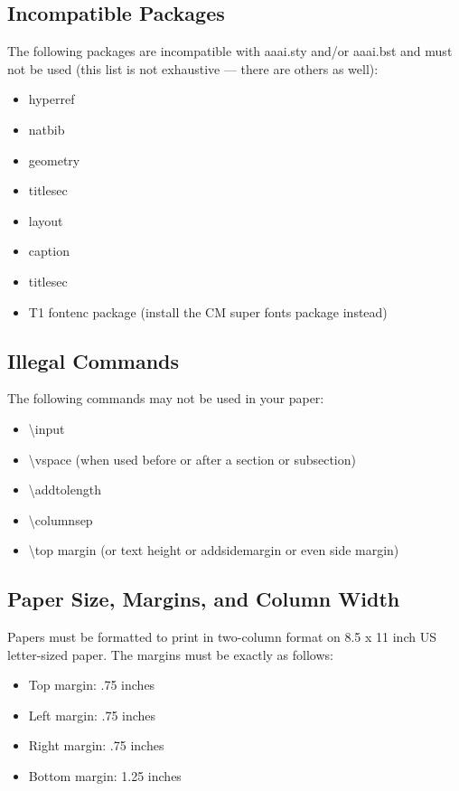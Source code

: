 \documentclass[letterpaper]{article}
\begin{document}
\subsection{Incompatible Packages}
The following packages are incompatible with aaai.sty and/or aaai.bst and must not be used (this list is not exhaustive --- there are others as well):
\begin{itemize}
\item hyperref
\item natbib
\item geometry
\item titlesec
\item layout
\item caption
\item titlesec
\item T1 fontenc package (install the CM super fonts package instead)
\end{itemize}

\subsection{Illegal Commands}
The following commands may not be used in your paper:
\begin{itemize}
\item \textbackslash input
\item \textbackslash vspace (when used before or after a section or subsection)
\item \textbackslash addtolength 
\item \textbackslash columnsep
\item \textbackslash top margin (or text height or addsidemargin or even side margin)
\end{itemize}

\subsection{Paper Size, Margins, and Column Width}
Papers must be formatted to print in two-column format on 8.5 x 11 inch US letter-sized paper. The margins must be exactly as follows: 
\begin{itemize}
\item Top margin: .75 inches
\item Left margin: .75 inches
\item Right margin: .75 inches
\item Bottom margin: 1.25 inches
\end{itemize} 
\end{document}
